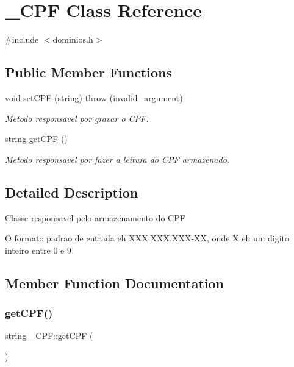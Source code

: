 \hypertarget{class___c_p_f}{}\section{\+\_\+\+C\+PF Class Reference}
\label{class___c_p_f}


{\ttfamily \#include $<$dominios.\+h$>$}

\subsection*{Public Member Functions}
\begin{DoxyCompactItemize}
\item 
void \mbox{\hyperlink{class___c_p_f_ad113fae4b663b4e393447cd4156249bb}{set\+C\+PF}} (string)  throw (invalid\+\_\+argument)
\begin{DoxyCompactList}\small\item\em Metodo responsavel por gravar o C\+PF. \end{DoxyCompactList}\item 
string \mbox{\hyperlink{class___c_p_f_a6e8be591208af464bdcdaa3fe0056c34}{get\+C\+PF}} ()
\begin{DoxyCompactList}\small\item\em Metodo responsavel por fazer a leitura do C\+PF armazenado. \end{DoxyCompactList}\end{DoxyCompactItemize}


\subsection{Detailed Description}
Classe responsavel pelo armazenamento do C\+PF

O formato padrao de entrada eh X\+X\+X.\+X\+X\+X.\+X\+XX-\/XX, onde X eh um digito inteiro entre 0 e 9 

\subsection{Member Function Documentation}
\mbox{\label{class___c_p_f_a6e8be591208af464bdcdaa3fe0056c34}} 
\subsubsection{\texorpdfstring{getCPF()}{getCPF()}}
{\footnotesize\ttfamily string \+\_\+\+C\+P\+F\+::get\+C\+PF (\begin{DoxyParamCaption}{ }\end{DoxyParamCaption})\hspace{0.3cm}{\ttfamily [inline]}}



